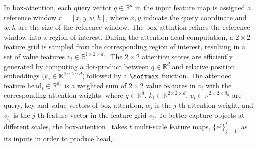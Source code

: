 In box-attention, each query vector $q \in \mathbb{R}^d$ in the input feature map is assigned a reference window $r {=} [x, y, w, h]$, where $x, y$ indicate the query coordinate and $w, h$ are the size of the reference window. The box-attention refines the reference window into a region of interest.
%
%
During the attention head computation, a $2 {\times} 2$ feature grid is sampled from the corresponding region of interest, resulting in a set of value features $v_i \in \mathbb{R}^{2 \times 2 \times d_h}$. The $2 {\times} 2$ attention scores are efficiently generated by computing a dot-product between $q \in \mathbb{R}^d$ and relative position embeddings ($k_i \in \mathbb{R}^{2 \times 2 \times d}$) followed by a $\softmax$ function. The attended feature $\mathrm{head}_i \in \mathbb{R}^{d_h}$ is a weighted sum of $2 {\times} 2$ value features in $v_i$ with the corresponding attention weights:
%
%
where $q \in \mathbb{R}^d$, $k_i \in \mathbb{R}^{2 \times 2 \times d}$, $v_i \in \mathbb{R}^{2 \times 2 \times d_h}$ are query, key and value vectors of box-attention, $\alpha_j$ is the $j$-th attention weight, and $v_{i_j}$ is the $j$-th feature vector in the feature grid $v_i$. To better capture objects at different scales, the box-attention~\cite{nguyen2022boxer} takes $t$ multi-scale feature maps, $\{e^j\}_{j=1}^t$, as its inputs in order to produce $\mathrm{head}_i$.

